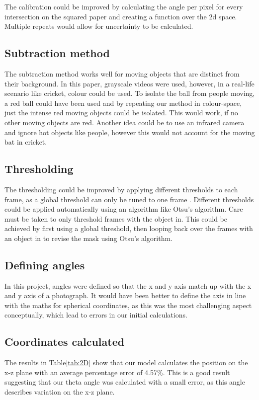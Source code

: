 \documentclass{article}
\begin{document}
The calibration could be improved by calculating the angle per pixel for every intersection on the squared paper and creating a function over the 2d space. Multiple repeats would allow for uncertainty to be calculated. 

\subsection{Subtraction method}

The subtraction method works well for moving objects that are distinct from their background. In this paper, grayscale videos were used, however, in a real-life scenario like cricket, colour could be used. To isolate the ball from people moving, a red ball could have been used and by repeating our method in colour-space, just the intense red moving objects could be isolated. This would work, if no other moving objects are red. Another idea could be to use an infrared camera and ignore hot objects like people, however this would not account for the moving bat in cricket. 

\subsection{Thresholding}

The thresholding could be improved by applying different thresholds to each frame, as a global threshold can only be tuned to one frame . Different thresholds could be applied automatically using an algorithm like Otsu’s algorithm. Care must be taken to only threshold frames with the object in. This could be achieved by first using a global threshold, then looping back over the frames with an object in to revise the mask using Otsu’s algorithm. \cite{OTSU}


\subsection{Defining angles}

In this project, angles were defined so that the x and y axis match up with the x and y axis of a photograph. It would have been better to define the axis in line with the maths for spherical coordinates, as this was the most challenging aspect conceptually, which lead to errors in our initial calculations. 

\subsection{Coordinates calculated}
The results in Table\ref{tab:2D} show that our model calculates the position on the x-z plane with an average percentage error of 4.57\%. This is a good result suggesting that our theta angle was calculated with a small error, as this angle describes variation on the x-z plane.
\end{document}
